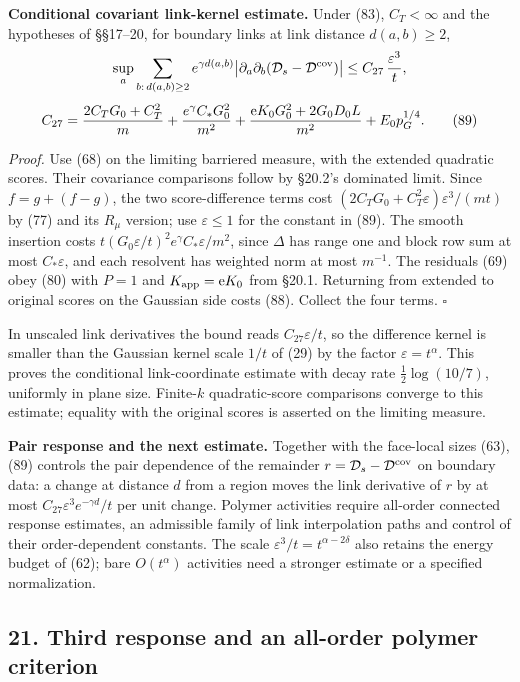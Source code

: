 \documentclass[11pt,a4paper]{article}
\begin{document}
\textbf{Conditional covariant link-kernel estimate.} Under (83),
\(C_T<\infty\) and the hypotheses of §§17--20, for boundary links at
link distance \(d(a,b)\ge2\),
\[\sup_a\sum_{b:\,d(a,b)\ge2}e^{\gamma d(a,b)}\bigl|\partial_a\partial_b(\mathcal D_s-\mathcal D^{\rm cov})\bigr|
\le C_{27}\,{\varepsilon^3\over t},\]
\[C_{27}={2C_TG_0+C_T^2\over m}+{e^\gamma C_*G_0^2\over m^2}
+{\mathrm eK_0G_0^2+2G_0D_0L\over m^2}+E_0p_G^{1/4}.\tag{89}\]

\emph{Proof.} Use (68) on the limiting barriered measure, with the
extended quadratic scores. Their covariance comparisons follow by
§20.2's dominated limit. Since \(f=g+(f-g)\), the two score-difference
terms cost \((2C_TG_0+C_T^2\varepsilon)\varepsilon^3/(mt)\) by (77) and
its \(R_\mu\) version; use \(\varepsilon\le1\) for the constant in (89).
The smooth insertion costs
\(t(G_0\varepsilon/t)^2e^\gamma C_*\varepsilon/m^2\), since \(\Delta\)
has range one and block row sum at most \(C_*\varepsilon\), and each
resolvent has weighted norm at most \(m^{-1}\). The residuals (69) obey
(80) with \(P=1\) and \(K_{\rm app}=\mathrm eK_0\) from §20.1. Returning
from extended to original scores on the Gaussian side costs (88).
Collect the four terms. \(\square\)

In unscaled link derivatives the bound reads \(C_{27}\varepsilon/t\), so
the difference kernel is smaller than the Gaussian kernel scale \(1/t\)
of (29) by the factor \(\varepsilon=t^\alpha\). This proves the
conditional link-coordinate estimate with decay rate
\(\frac12\log(10/7)\), uniformly in plane size. Finite-\(k\)
quadratic-score comparisons converge to this estimate; equality with the
original scores is asserted on the limiting measure.

\textbf{Pair response and the next estimate.} Together with the
face-local sizes (63), (89) controls the pair dependence of the
remainder \(r=\mathcal D_s-\mathcal D^{\rm cov}\) on boundary data: a
change at distance \(d\) from a region moves the link derivative of
\(r\) by at most \(C_{27}\varepsilon^3e^{-\gamma d}/t\) per unit change.
Polymer activities require all-order connected response estimates, an
admissible family of link interpolation paths and control of their
order-dependent constants. The scale
\(\varepsilon^3/t=t^{\alpha-2\delta}\) also retains the energy budget of
(62); bare \(O(t^\alpha)\) activities need a stronger estimate or a
specified normalization.

\hypertarget{third-response-and-an-all-order-polymer-criterion}{%
\subsection{21. Third response and an all-order polymer
criterion}\label{third-response-and-an-all-order-polymer-criterion}}
\end{document}
